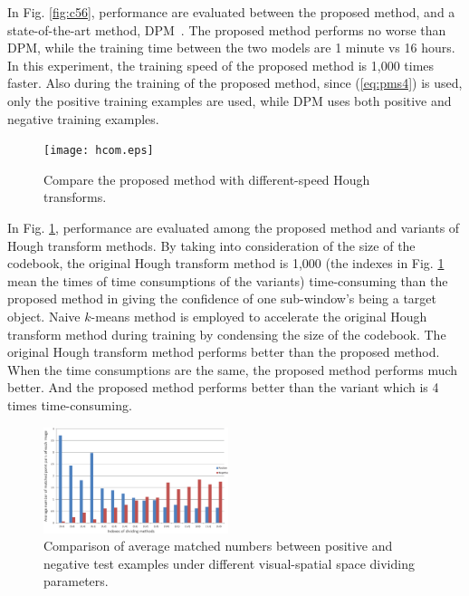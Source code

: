 \documentclass[paper]{ieice}
\begin{document}
In Fig. \ref{fig:c56}, performance are evaluated between the proposed method, and a state-of-the-art method, DPM~\cite{ac31}. The proposed method performs no worse than DPM,
while the training time between the two models are 1 minute vs 16 hours. In this experiment, the training speed of the proposed method is 1,000 times faster. Also during the training of the proposed method, since (\ref{eq:pms4}) is used, only the positive training examples are used, while DPM uses both positive and negative training examples.

\begin{figure}[!htbp]
\centering

\texttt{[image: hcom.eps]}


\caption[Comparison between Pyramid Match Score and Hough transform]{Compare the proposed method with different-speed Hough transforms.}
\label{fig:c5i}
\end{figure}


In Fig. \ref{fig:c5i}, performance are evaluated among the proposed method and variants of Hough transform methods. By taking into consideration of the size of the codebook, the original Hough transform method is 1,000 (the indexes in Fig. \ref{fig:c5i} mean the times of time consumptions of the variants) time-consuming than the proposed method in giving the confidence of one sub-window's being a target object. Naive $k$-means method is employed to accelerate the original Hough transform method during training by condensing the size of the codebook. The original Hough transform method performs better than the proposed method. When the time consumptions are the same, the proposed method performs much better. And the proposed method performs better than the variant which is 4 times time-consuming.

\begin{figure}[!htbp]
\centering

\includegraphics[width=0.48\textwidth]{ancp.eps}


\caption[Average numbers of matched pairs of positive and negative test examples]{Comparison of average matched numbers between positive and negative test examples under different visual-spatial space dividing parameters.}
\label{fig:c57}
\end{figure}
\end{document}
